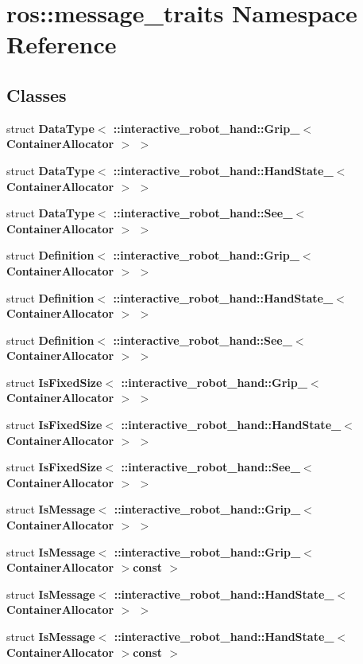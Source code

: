 \section{ros\-:\-:message\-\_\-traits Namespace Reference}
\label{namespaceros_1_1message__traits}
\subsection*{Classes}
\begin{DoxyCompactItemize}
\item 
struct {\bf Data\-Type$<$ \-::interactive\-\_\-robot\-\_\-hand\-::\-Grip\-\_\-$<$ Container\-Allocator $>$ $>$}
\item 
struct {\bf Data\-Type$<$ \-::interactive\-\_\-robot\-\_\-hand\-::\-Hand\-State\-\_\-$<$ Container\-Allocator $>$ $>$}
\item 
struct {\bf Data\-Type$<$ \-::interactive\-\_\-robot\-\_\-hand\-::\-See\-\_\-$<$ Container\-Allocator $>$ $>$}
\item 
struct {\bf Definition$<$ \-::interactive\-\_\-robot\-\_\-hand\-::\-Grip\-\_\-$<$ Container\-Allocator $>$ $>$}
\item 
struct {\bf Definition$<$ \-::interactive\-\_\-robot\-\_\-hand\-::\-Hand\-State\-\_\-$<$ Container\-Allocator $>$ $>$}
\item 
struct {\bf Definition$<$ \-::interactive\-\_\-robot\-\_\-hand\-::\-See\-\_\-$<$ Container\-Allocator $>$ $>$}
\item 
struct {\bf Is\-Fixed\-Size$<$ \-::interactive\-\_\-robot\-\_\-hand\-::\-Grip\-\_\-$<$ Container\-Allocator $>$ $>$}
\item 
struct {\bf Is\-Fixed\-Size$<$ \-::interactive\-\_\-robot\-\_\-hand\-::\-Hand\-State\-\_\-$<$ Container\-Allocator $>$ $>$}
\item 
struct {\bf Is\-Fixed\-Size$<$ \-::interactive\-\_\-robot\-\_\-hand\-::\-See\-\_\-$<$ Container\-Allocator $>$ $>$}
\item 
struct {\bf Is\-Message$<$ \-::interactive\-\_\-robot\-\_\-hand\-::\-Grip\-\_\-$<$ Container\-Allocator $>$ $>$}
\item 
struct {\bf Is\-Message$<$ \-::interactive\-\_\-robot\-\_\-hand\-::\-Grip\-\_\-$<$ Container\-Allocator $>$const  $>$}
\item 
struct {\bf Is\-Message$<$ \-::interactive\-\_\-robot\-\_\-hand\-::\-Hand\-State\-\_\-$<$ Container\-Allocator $>$ $>$}
\item 
struct {\bf Is\-Message$<$ \-::interactive\-\_\-robot\-\_\-hand\-::\-Hand\-State\-\_\-$<$ Container\-Allocator $>$const  $>$}

\end{DoxyCompactItemize}
